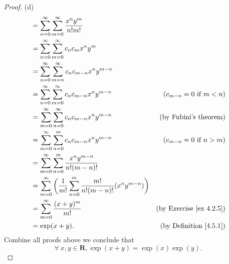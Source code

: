 \begin{proof}{(d)}
\begin{align*}
         & = \sum_{n = 0}^\infty \sum_{m = 0}^\infty \frac{x^n y^m}{n! m!}                                                                            \\
         & = \sum_{n = 0}^\infty \sum_{m = 0}^\infty c_n c_m x^n y^m                                                                                  \\
         & = \sum_{n = 0}^\infty \sum_{m = n}^\infty c_n c_{m - n} x^n y^{m - n}                                                                      \\
         & = \sum_{n = 0}^\infty \sum_{m = 0}^\infty c_n c_{m - n} x^n y^{m - n}                                & (c_{m - n} = 0 \text{ if } m < n)   \\
         & = \sum_{m = 0}^\infty \sum_{n = 0}^\infty c_n c_{m - n} x^n y^{m - n}                                & \text{(by Fubini's theorem)}        \\
         & = \sum_{m = 0}^\infty \sum_{n = 0}^m c_n c_{m - n} x^n y^{m - n}                                     & (c_{m - n} = 0 \text{ if } n > m)   \\
         & = \sum_{m = 0}^\infty \sum_{n = 0}^m \frac{x^n y^{m - n}}{n! (m - n)!}                                                                     \\
         & = \sum_{m = 0}^\infty \bigg(\frac{1}{m!} \sum_{n = 0}^m \frac{m!}{n! (m - n)!} (x^n y^{m - n})\bigg)                                       \\
         & = \sum_{m = 0}^\infty \frac{(x + y)^m}{m!}                                                           & \text{(by Exercise \ref{ex 4.2.5})} \\
         & = \exp(x + y).                                                                                       & \text{(by Definition \ref{4.5.1})}
    \end{align*}
    Combine all proofs above we conclude that
    \[
        \forall\ x, y \in \mathbf{R}, \exp(x + y) = \exp(x) \exp(y).
    \]
\end{proof}

